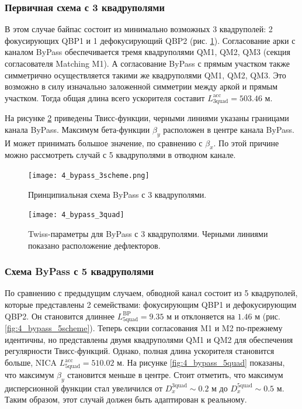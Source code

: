 \subsubsection{Первичная схема с 3 квадруполями}\label{sec:EDM/Wien_filter/ByPass/3quad}

\par В этом случае байпас состоит из минимально возможных 3 квадруполей: 2 фокусирующих QBP1 и 1 дефокусирующий QBP2 (рис. \ref{fig:4_bypass_3scheme}). Согласование арки с каналом ByPass обеспечивается тремя квадруполями QM1, QM2, QM3 (секция согласователя Matching M1). А согласование ByPass с прямым участком также симметрично осуществляется такими же квадруполями QM1, QM2, QM3. Это возможно в силу изначально заложенной симметрии между аркой и прямым участком. Тогда общая длина всего ускорителя составит $L_{\textrm{3quad}}^{\textrm{acc}}=503.46$ м.
\par На рисунке \ref{fig:4_bypass_3quad} приведены Твисс-функции, черными линиями указаны границами канала ByPass. Максимум бета-функции $\beta_y$ расположен в центре канала ByPass. И может принимать большое значение, по сравнению с $\beta_{x}$. По этой причине можно рассмотреть случай с 5 квадруполями в отводном канале.

\begin{figure}[!h]
  \centering
   \texttt{[image: 4\_bypass\_3scheme.png]}
   \caption{Принципиальная схема ByPass с 3 квадруполями.}
   \label{fig:4_bypass_3scheme}
\end{figure}

\begin{figure}[!h]
  \centering
   \texttt{[image: 4\_bypass\_3quad]}
   \caption{Twiss-параметры для ByPass с 3 квадруполями. Черными линиями показано расположение дефлекторов.}
   \label{fig:4_bypass_3quad}
\end{figure}

\subsubsection{Схема ByPass с 5 квадруполями}\label{sec:EDM/Wien_filter/ByPass/5quad}

\par По сравнению с предыдущим случаем, обводной канал состоит из 5 квадруполей, которые представлены 2 семействами: фокусирующим QBP1 и дефокусирующим QBP2. Он становится длиннее $L_{\textrm{5quad}}^{\textrm{BP}}=9.35$ м и отклоняется на $1.46$ м (рис. \ref{fig:4_bypass_5scheme}). Теперь секции согласования M1 и M2 по-прежнему идентичны, но представлены двумя квадруполями QM1 и QM2 для обеспечения регулярности Твисс-функций. Однако, полная длина ускорителя становится больше, NICA $L_{\textrm{5quad}}^{\textrm{acc}}=510.02$ м. На рисунке \ref{fig:4_bypass_5quad} показаны, что максимум $\beta_y$ становится меньше в центре. Стоит отметить, что максимум дисперсионной функции стал увеличился от $D_x^{\textrm{3quad}} \sim 0.2$ м до $D_x^{\textrm{5quad}} \sim 0.5$ м. Таким образом, этот случай должен быть адаптирован к реальному.

